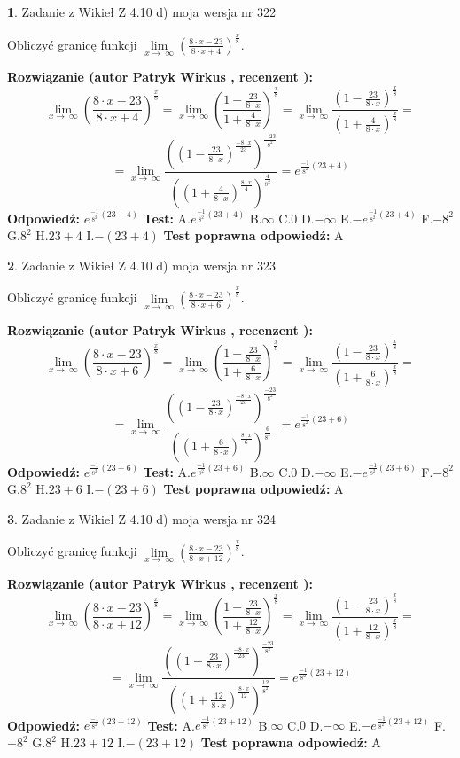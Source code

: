\documentclass[12pt, a4paper]{article}
\theoremstyle{definition} %
\newtheorem{zad}{}
\newcommand{\zadStart}[1]{\begin{zad}#1\newline}
\newcommand{\zadStop}{\end{zad}}
\newcommand{\rozwStart}[2]{\noindent \textbf{Rozwiązanie (autor #1 , recenzent #2): }\newline}
\newcommand{\rozwStop}{\newline}
\newcommand{\odpStart}{\noindent \textbf{Odpowiedź:}\newline}
\newcommand{\odpStop}{\newline}
\newcommand{\testStart}{\noindent \textbf{Test:}\newline}
\newcommand{\testStop}{\newline}
\newcommand{\kluczStart}{\noindent \textbf{Test poprawna odpowiedź:}\newline}
\newcommand{\kluczStop}{\newline}
\begin{document}
\zadStart{Zadanie z Wikieł Z 4.10 d) moja wersja nr 322}


Obliczyć granicę funkcji  $\lim\limits_{x\to\ \infty}(\frac{8\cdot x-23}{8\cdot x+4})^{\frac{x}{8}}$.
\zadStop
\rozwStart{Patryk Wirkus}{}
$$\lim\limits_{x\to\ \infty}(\frac{8\cdot x-23}{8\cdot x+4})^{\frac{x}{8}} = \lim\limits_{x\to\ \infty}(\frac{1-\frac{23}{8\cdot x}}{1+\frac{4}{8\cdot x}})^{\frac{x}{8}}=\lim\limits_{x\to\ \infty}\frac{(1-\frac{23}{8\cdot x})^{\frac{x}{8}}}{(1+\frac{4}{8\cdot x})^{\frac{x}{8}}}=$$
$$=\lim\limits_{x\to\ \infty}\frac{((1-\frac{23}{8\cdot x})^{\frac{-8\cdot x}{23}})^{\frac{-23}{8^{2}}}}{((1+\frac{4}{8\cdot x})^{\frac{8\cdot x}{4}})^{\frac{4}{8^{2}}}}=e^{\frac{-1}{8^{2}}(23+4)}$$
\rozwStop
\odpStart
$e^{\frac{-1}{8^{2}}(23+4)}$
\odpStop
\testStart
A.$e^{\frac{-1}{8^{2}}(23+4)}$ B.$\infty$ C.$0$ D.$-\infty$ E.$-e^{\frac{-1}{8^{2}}(23+4)}$
F.$-8^{2}$ G.$8^{2}$
H.$23+4$
I.$-(23+4)$
\testStop
\kluczStart
A
\kluczStop



\zadStart{Zadanie z Wikieł Z 4.10 d) moja wersja nr 323}


Obliczyć granicę funkcji  $\lim\limits_{x\to\ \infty}(\frac{8\cdot x-23}{8\cdot x+6})^{\frac{x}{8}}$.
\zadStop
\rozwStart{Patryk Wirkus}{}
$$\lim\limits_{x\to\ \infty}(\frac{8\cdot x-23}{8\cdot x+6})^{\frac{x}{8}} = \lim\limits_{x\to\ \infty}(\frac{1-\frac{23}{8\cdot x}}{1+\frac{6}{8\cdot x}})^{\frac{x}{8}}=\lim\limits_{x\to\ \infty}\frac{(1-\frac{23}{8\cdot x})^{\frac{x}{8}}}{(1+\frac{6}{8\cdot x})^{\frac{x}{8}}}=$$
$$=\lim\limits_{x\to\ \infty}\frac{((1-\frac{23}{8\cdot x})^{\frac{-8\cdot x}{23}})^{\frac{-23}{8^{2}}}}{((1+\frac{6}{8\cdot x})^{\frac{8\cdot x}{6}})^{\frac{6}{8^{2}}}}=e^{\frac{-1}{8^{2}}(23+6)}$$
\rozwStop
\odpStart
$e^{\frac{-1}{8^{2}}(23+6)}$
\odpStop
\testStart
A.$e^{\frac{-1}{8^{2}}(23+6)}$ B.$\infty$ C.$0$ D.$-\infty$ E.$-e^{\frac{-1}{8^{2}}(23+6)}$
F.$-8^{2}$ G.$8^{2}$
H.$23+6$
I.$-(23+6)$
\testStop
\kluczStart
A
\kluczStop



\zadStart{Zadanie z Wikieł Z 4.10 d) moja wersja nr 324}


Obliczyć granicę funkcji  $\lim\limits_{x\to\ \infty}(\frac{8\cdot x-23}{8\cdot x+12})^{\frac{x}{8}}$.
\zadStop
\rozwStart{Patryk Wirkus}{}
$$\lim\limits_{x\to\ \infty}(\frac{8\cdot x-23}{8\cdot x+12})^{\frac{x}{8}} = \lim\limits_{x\to\ \infty}(\frac{1-\frac{23}{8\cdot x}}{1+\frac{12}{8\cdot x}})^{\frac{x}{8}}=\lim\limits_{x\to\ \infty}\frac{(1-\frac{23}{8\cdot x})^{\frac{x}{8}}}{(1+\frac{12}{8\cdot x})^{\frac{x}{8}}}=$$
$$=\lim\limits_{x\to\ \infty}\frac{((1-\frac{23}{8\cdot x})^{\frac{-8\cdot x}{23}})^{\frac{-23}{8^{2}}}}{((1+\frac{12}{8\cdot x})^{\frac{8\cdot x}{12}})^{\frac{12}{8^{2}}}}=e^{\frac{-1}{8^{2}}(23+12)}$$
\rozwStop
\odpStart
$e^{\frac{-1}{8^{2}}(23+12)}$
\odpStop
\testStart
A.$e^{\frac{-1}{8^{2}}(23+12)}$ B.$\infty$ C.$0$ D.$-\infty$ E.$-e^{\frac{-1}{8^{2}}(23+12)}$
F.$-8^{2}$ G.$8^{2}$
H.$23+12$
I.$-(23+12)$
\testStop
\kluczStart
A
\kluczStop
\end{document}

